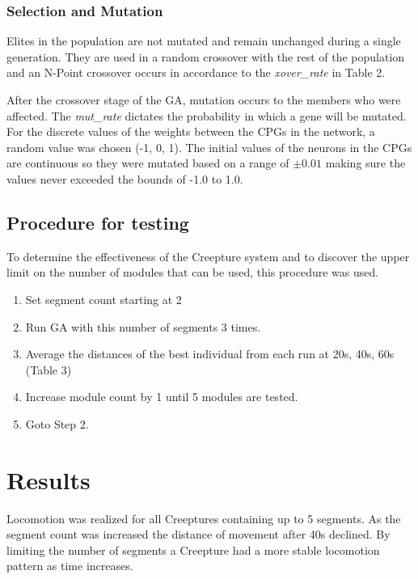 \documentclass{acm_proc_article-sp}
\begin{document}
\subsubsection{Selection and Mutation}

Elites in the population are not mutated and remain unchanged during a
single generation. They are used in a random crossover with the rest of
the population and an N-Point crossover occurs in accordance to the
\emph{xover\_rate} in Table 2.

After the crossover stage of the GA, mutation occurs to the members who
were affected. The \emph{mut\_rate} dictates the probability in which a
gene will be mutated. For the discrete values of the weights between the
CPGs in the network, a random value was chosen (-1, 0, 1). The initial
values of the neurons in the CPGs are continuous so they were mutated
based on a range of $\pm 0.01$ making sure the values never exceeded the
bounds of -1.0 to 1.0.

\subsection{Procedure for testing}

To determine the effectiveness of the Creepture system and to discover
the upper limit on the number of modules that can be used, this
procedure was used.

\begin{enumerate}
\itemsep1pt\parskip0pt
\item
  Set segment count starting at 2
\item
  Run GA with this number of segments 3 times.
\item
  Average the distances of the best individual from each run at 20s,
  40s, 60s (Table 3)
\item
  Increase module count by 1 until 5 modules are tested.
\item
  Goto Step 2.
\end{enumerate}

\section{Results}

Locomotion was realized for all Creeptures containing up to 5 segments.
As the segment count was increased the distance of movement after 40s
declined. By limiting the number of segments a Creepture had a more
stable locomotion pattern as time increases.
\end{document}
